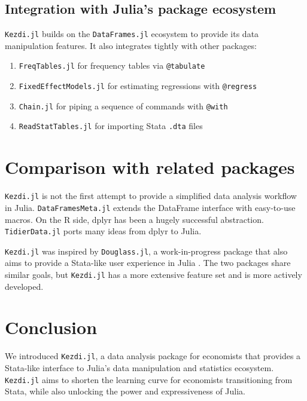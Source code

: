 \documentclass{juliacon}
\begin{document}
\subsection{Integration with Julia's package ecosystem}

\texttt{Kezdi.jl} builds on the \texttt{DataFrames.jl} ecosystem \cite{DataFrame.jl2023} to provide its data manipulation features. It also integrates tightly with other packages:

\begin{enumerate}
	\item \texttt{FreqTables.jl} \cite{FreqTables.jl2023} for frequency tables via \texttt{@tabulate}
	\item \texttt{FixedEffectModels.jl} \cite{FixedEffectModels.jl2023} for estimating regressions with \texttt{@regress}
	\item \texttt{Chain.jl} \cite{Chain} for piping a sequence of commands with \texttt{@with}
	\item \texttt{ReadStatTables.jl} \cite{ReadStatTables} for importing Stata \texttt{.dta} files
\end{enumerate}

\section{Comparison with related packages}
\texttt{Kezdi.jl} is not the first attempt to provide a simplified data analysis workflow in Julia. \texttt{DataFramesMeta.jl} \cite{DataFramesMeta} extends the DataFrame interface with easy-to-use macros. On the R side, dplyr \cite{dplyr2023} has been a hugely successful abstraction. \texttt{TidierData.jl} \cite{tidier2022} ports many ideas from dplyr to Julia. 

\texttt{Kezdi.jl} was inspired by \texttt{Douglass.jl}, a work-in-progress package that also aims to provide a Stata-like user experience in Julia \cite{Douglass.jl2023}. The two packages share similar goals, but \texttt{Kezdi.jl} has a more extensive feature set and is more actively developed.

\section{Conclusion}

We introduced \texttt{Kezdi.jl}, a data analysis package for economists that provides a Stata-like interface to Julia's data manipulation and statistics ecosystem. \texttt{Kezdi.jl} aims to shorten the learning curve for economists transitioning from Stata, while also unlocking the power and expressiveness of Julia.
\end{document}
